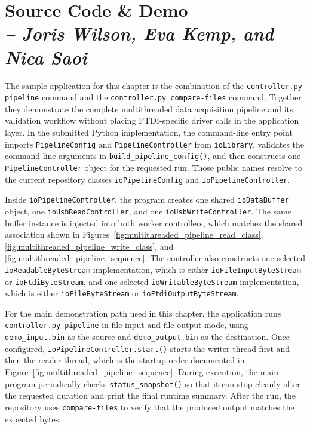 \section{Source Code \& Demo \\
\small{\textit{-- Joris Wilson, Eva Kemp, and Nica Saoi}}}
\label{Section::Source Code and Demo}

The sample application for this chapter is the combination of the \texttt{controller.py pipeline} command and the \texttt{controller.py compare-files} command. Together they demonstrate the complete multithreaded data acquisition pipeline and its validation workflow without placing FTDI-specific driver calls in the application layer. In the submitted Python implementation, the command-line entry point imports \texttt{PipelineConfig} and \texttt{PipelineController} from \texttt{ioLibrary}, validates the command-line arguments in \texttt{build\_pipeline\_config()}, and then constructs one \texttt{PipelineController} object for the requested run. Those public names resolve to the current repository classes \texttt{ioPipelineConfig} and \texttt{ioPipelineController}.

Inside \texttt{ioPipelineController}, the program creates one shared \texttt{ioDataBuffer} object, one \texttt{ioUsbReadController}, and one \texttt{ioUsbWriteController}. The same buffer instance is injected into both worker controllers, which matches the shared association shown in Figures~\ref{fig:multithreaded_pipeline_read_class}, \ref{fig:multithreaded_pipeline_write_class}, and \ref{fig:multithreaded_pipeline_sequence}. The controller also constructs one selected \texttt{ioReadableByteStream} implementation, which is either \texttt{ioFileInputByteStream} or \texttt{ioFtdiByteStream}, and one selected \texttt{ioWritableByteStream} implementation, which is either \texttt{ioFileByteStream} or \texttt{ioFtdiOutputByteStream}.

For the main demonstration path used in this chapter, the application runs \texttt{controller.py pipeline} in file-input and file-output mode, using \texttt{demo\_input.bin} as the source and \texttt{demo\_output.bin} as the destination. Once configured, \texttt{ioPipelineController.start()} starts the writer thread first and then the reader thread, which is the startup order documented in Figure~\ref{fig:multithreaded_pipeline_sequence}. During execution, the main program periodically checks \texttt{status\_snapshot()} so that it can stop cleanly after the requested duration and print the final runtime summary. After the run, the repository uses \texttt{compare-files} to verify that the produced output matches the expected bytes.

